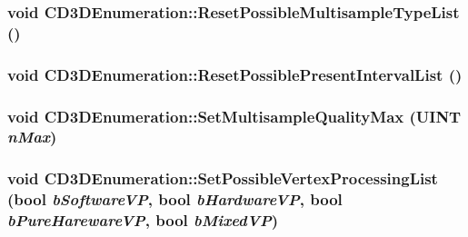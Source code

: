 \label{class_c_d3_d_enumeration_a4129dc6557f638c49f7d33a9b788070f}
\hypertarget{class_c_d3_d_enumeration_a8209982a323e3fa1e90779bf2114bda8}{
\subsubsection[{ResetPossibleMultisampleTypeList}]{\setlength{\rightskip}{0pt plus 5cm}void CD3DEnumeration::ResetPossibleMultisampleTypeList ()}}
\label{class_c_d3_d_enumeration_a8209982a323e3fa1e90779bf2114bda8}
\hypertarget{class_c_d3_d_enumeration_ab5d8cfd17ddf102f83f8b2b19a904283}{
\subsubsection[{ResetPossiblePresentIntervalList}]{\setlength{\rightskip}{0pt plus 5cm}void CD3DEnumeration::ResetPossiblePresentIntervalList ()}}
\label{class_c_d3_d_enumeration_ab5d8cfd17ddf102f83f8b2b19a904283}
\hypertarget{class_c_d3_d_enumeration_ad7b8475ce673795395f252b279a3d622}{
\subsubsection[{SetMultisampleQualityMax}]{\setlength{\rightskip}{0pt plus 5cm}void CD3DEnumeration::SetMultisampleQualityMax (UINT {\em nMax})}}
\label{class_c_d3_d_enumeration_ad7b8475ce673795395f252b279a3d622}
\hypertarget{class_c_d3_d_enumeration_acc023b14d22d5a56f4c20c84bd1fbdb5}{
\subsubsection[{SetPossibleVertexProcessingList}]{\setlength{\rightskip}{0pt plus 5cm}void CD3DEnumeration::SetPossibleVertexProcessingList (bool {\em bSoftwareVP}, \/  bool {\em bHardwareVP}, \/  bool {\em bPureHarewareVP}, \/  bool {\em bMixedVP})}}
